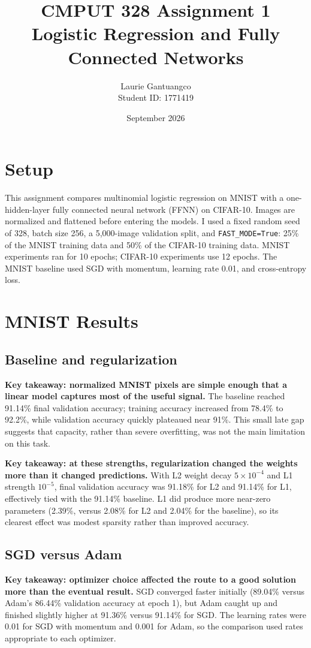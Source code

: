 \documentclass[11pt]{article}
\title{CMPUT 328 Assignment 1\\\large Logistic Regression and Fully Connected Networks}
\author{Laurie Gantuangco \\ Student ID: 1771419}
\date{September 2026}
\begin{document}
\maketitle
\vspace{-1em}
\small

\section{Setup}
This assignment compares multinomial logistic regression on MNIST with a one-hidden-layer fully connected neural network (FFNN) on CIFAR-10. Images are normalized and flattened before entering the models. I used a fixed random seed of 328, batch size 256, a 5,000-image validation split, and \texttt{FAST\_MODE=True}: 25\% of the MNIST training data and 50\% of the CIFAR-10 training data. MNIST experiments ran for 10 epochs; CIFAR-10 experiments use 12 epochs. The MNIST baseline used SGD with momentum, learning rate 0.01, and cross-entropy loss.

\section{MNIST Results}
\subsection{Baseline and regularization}
\textbf{Key takeaway: normalized MNIST pixels are simple enough that a linear model captures most of the useful signal.} The baseline reached 91.14\% final validation accuracy; training accuracy increased from 78.4\% to 92.2\%, while validation accuracy quickly plateaued near 91\%. This small late gap suggests that capacity, rather than severe overfitting, was not the main limitation on this task.

\textbf{Key takeaway: at these strengths, regularization changed the weights more than it changed predictions.} With L2 weight decay $5\times10^{-4}$ and L1 strength $10^{-5}$, final validation accuracy was 91.18\% for L2 and 91.14\% for L1, effectively tied with the 91.14\% baseline. L1 did produce more near-zero parameters (2.39\%, versus 2.08\% for L2 and 2.04\% for the baseline), so its clearest effect was modest sparsity rather than improved accuracy.

\subsection{SGD versus Adam}
\textbf{Key takeaway: optimizer choice affected the route to a good solution more than the eventual result.} SGD converged faster initially (89.04\% versus Adam's 86.44\% validation accuracy at epoch 1), but Adam caught up and finished slightly higher at 91.36\% versus 91.14\% for SGD. The learning rates were 0.01 for SGD with momentum and 0.001 for Adam, so the comparison used rates appropriate to each optimizer.
\end{document}
